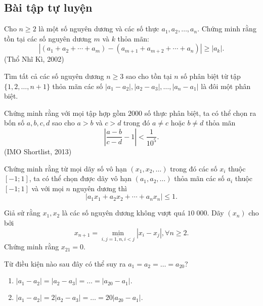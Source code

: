 \subsection{Bài tập tự luyện}
\begin{bt}%
	Cho $n \ge 2$ là một số nguyên dương và các số thực $a_1,a_2, \ldots, a_n$. Chứng minh rằng tồn tại các số nguyên dương $m$ và $k$ thỏa mãn:
	$$\left|(a_1+a_2+ \cdots +a_m)-(a_{m+1}+a_{m+2}+\cdots+a_n) \right| \ge |a_k|.$$
	\hfill (Thổ Nhĩ Kì, 2002)
\end{bt}

\begin{bt}%
	Tìm tất cả các số nguyên dương $n \ge 3$ sao cho tồn tại $n$ số phân biệt từ tập $\{1,2,\ldots,n+1\}$ thỏa mãn các số $|a_1-a_2|,|a_2-a_3|,\ldots ,|a_n-a_1|$ là đôi một phân biệt.
\end{bt}

\begin{bt}%
	Chứng minh rằng với mọi tập hợp gồm $2000$ số thực phân biệt, ta có thể chọn ra bốn số $a,b,c,d$ sao cho $a>b$ và $c>d$ trong đó $a \ne c$ hoặc $b \ne d$ thỏa mãn
	$$\left|\dfrac{a-b}{c-d}-1 \right|<\dfrac{1}{10^5}.$$
	\hfill (IMO Shortlist, 2013)
\end{bt}

\begin{bt}%
	Chứng minh rằng từ mọi dãy số vô hạn $(x_1,x_2,\ldots)$ trong đó các số $x_i$ thuộc $[-1;1]$, ta có thể chọn được dãy vô hạn $(a_1,a_2,\ldots)$ thỏa mãn các số $a_i$ thuộc $[-1;1]$ và với mọi $n$ nguyên dương thì
	$$|a_1x_1+a_2x_2+\cdots +a_nx_n|\le 1.$$
\end{bt}

\begin{bt}%
	Giả sử rằng $x_1,x_2$ là các số nguyên dương không vượt quá $10\;000$. Dãy $(x_n)$ cho bởi
	$$x_{n+1}= \displaystyle \min_{i,j=\overline{1,n},i<j} |x_i-x_j|,\forall n \ge 2.$$
	Chứng minh rằng $x_{21}=0.$
\end{bt}

\begin{bt}%
	Từ điều kiện nào sau đây có thể suy ra $a_1=a_2=\ldots =a_{20}$?
	\begin{enumerate} 
		\item $|a_1-a_2|=|a_2-a_3|=\ldots =|a_{20}-a_1|.$
		\item $|a_1-a_2|=2|a_2-a_3|=\ldots =20|a_{20}-a_1|.$
	\end{enumerate}
\end{bt}

